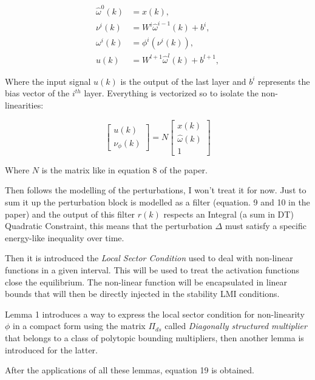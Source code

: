 \documentclass[12pt]{article}
\begin{document}
\begin{equation}
  \begin{aligned}
    \hat{\omega}^0(k) &= x(k), \\    
    \nu^i(k) &= W^i \hat{\omega}^{i-1}(k) + b^i, \\
    \omega^i(k) &= \phi^i( \nu^i(k)), \\
    u(k) &= W^{l+1} \hat{\omega}^l(k) + b^{l+1},
  \end{aligned}
\end{equation}

Where the input signal $u(k)$ is the output of the last layer and $b^i$ represents the bias vector of the $i^{th}$ layer.
Everything is vectorized so to isolate the non-linearities:

\begin{equation}
  \begin{bmatrix}
    u(k)\\
    \nu_{\phi}(k)
  \end{bmatrix} = N \begin{bmatrix}
    x(k)\\
    \hat{\omega}(k)\\
    1
  \end{bmatrix}
\end{equation}

Where $N$ is the matrix like in equation 8 of the paper.

Then follows the modelling of the perturbations, I won't treat it for now. Just to sum it up the perturbation block is modelled as a filter (equation. 9 and 10 in the paper) and the output of this filter $r(k)$ respects an Integral (a sum in DT) Quadratic Constraint, this means that the perturbation $\Delta$ must satisfy a specific energy-like inequality over time.

Then it is introduced the \textit{Local Sector Condition} used to deal with non-linear functions in a given interval. This will be used to treat the activation functions close the equilibrium. The non-linear function will be encapsulated in linear bounds that will then be directly injected in the stability LMI conditions.

Lemma 1 introduces a way to express the local sector condition for non-linearity $\phi$ in a compact form using the matrix $\Pi_{ds}$ called \textit{Diagonally structured multiplier} that belongs to a class of polytopic bounding multipliers, then another lemma is introduced for the latter. 

After the applications of all these lemmas, equation 19 is obtained. 
\end{document}
